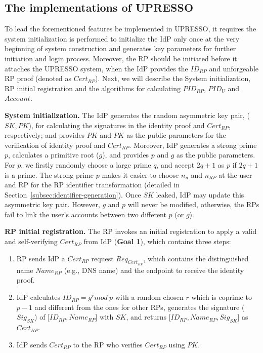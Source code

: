 \subsection{The implementations of UPRESSO}
\label{implementations}
To lead the forementioned features be implemented in UPRESSO, it requires the system initialization is performed to initialize the IdP only once at the very beginning of system construction and generates key parameters for further initiation and login process. Moreover, the RP should be initiated before it attaches the UPRESSO system, when the IdP provides the $ID_{RP}$ and unforgeable RP proof (denoted as $Cert_{RP}$). Next, we will describe the System initialization, RP initial registration and the algorithms for calculating  $PID_{RP}$, $PID_U$ and $Account$.

\vspace{1mm}\noindent \textbf{System initialization.} The IdP generates the random asymmetric key pair, ($SK, PK$),
for calculating the signatures in the identity proof and $Cert_{RP}$, respectively;
and provides $PK$ and $PK$ as the public parameters for the verification of identity proof and $Cert_{RP}$.
Moreover, IdP generates a strong prime $p$, calculates  a primitive root ($g$), and provides $p$ and $g$ as the public parameters.
For $p$, we firstly randomly choose a large prime $q$, and accept  $2q+1$ as $p$ if $2q+1$ is a prime.
The strong prime $p$ makes it easier to choose $n_{u}$ and $n_{RP}$ at the user and RP for the RP identifier transformation (detailed in  Section~\ref{subsec:identifier-generation}). %
Once $SK$ leaked, IdP may update this asymmetric key pair.
However, $g$ and $p$ will never be modified, otherwise, the RPs fail to link the user's accounts between two different $p$ (or $g$).


\vspace{1mm}\noindent\textbf{RP initial registration.}
The RP invokes an initial registration to apply a valid and self-verifying $Cert_{RP}$ from IdP (\textbf{Goal 1}),
 which contains three steps:

\begin{enumerate}
\item RP sends IdP a $Cert_{RP}$ request $Req_{Cert_{RP}}$, which contains the distinguished name $Name_{RP}$ (e.g., DNS name) and the endpoint to receive the identity proof.
\item IdP calculates $ID_{RP} = g^r mod \ p$ with a random chosen $r$ which is coprime to $p-1$ and different from the ones for other RPs,  generates the signature ($Sig_{SK}$) of [$ID_{RP}, Name_{RP}$] with $SK$, and returns [$ID_{RP}, Name_{RP}, Sig_{SK}$] as $Cert_{RP}$.
\item IdP sends $Cert_{RP}$ to the RP who verifies $Cert_{RP}$ using $PK$.
\end{enumerate}



